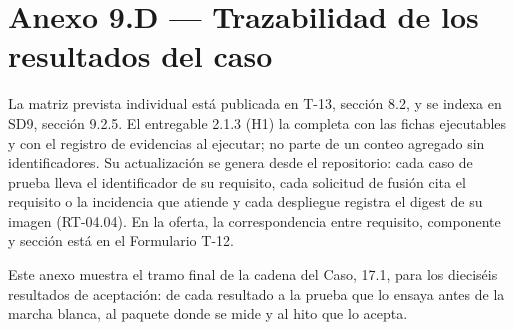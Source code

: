 \section*{Anexo 9.D — Trazabilidad de los resultados del caso}

La matriz prevista individual está publicada en T-13, sección 8.2, y se indexa en SD9, sección 9.2.5. El entregable 2.1.3 (H1) la completa con las fichas ejecutables y con el registro de evidencias al ejecutar; no parte de un conteo agregado sin identificadores. Su actualización se genera desde el repositorio: cada caso de prueba lleva el identificador de su requisito, cada solicitud de fusión cita el requisito o la incidencia que atiende y cada despliegue registra el digest de su imagen (RT-04.04). En la oferta, la correspondencia entre requisito, componente y sección está en el Formulario T-12.

Este anexo muestra el tramo final de la cadena del Caso, 17.1, para los dieciséis resultados de aceptación: de cada resultado a la prueba que lo ensaya antes de la marcha blanca, al paquete donde se mide y al hito que lo acepta.

